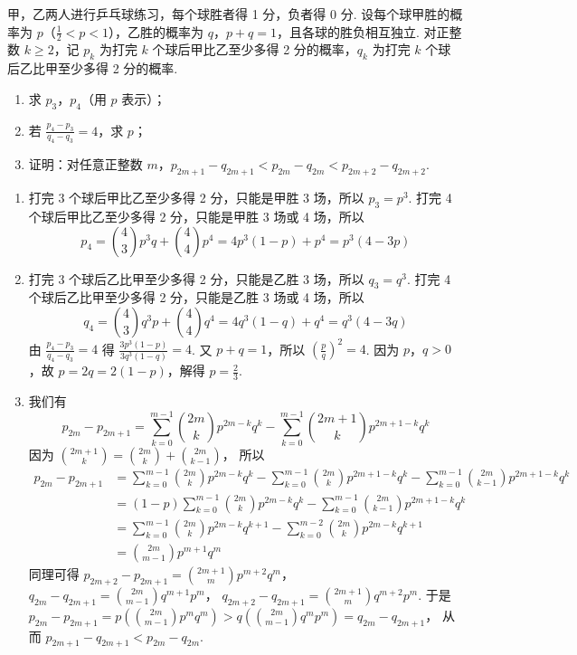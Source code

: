 \documentclass[UTF8,a4paper,oneside,11pt]{ctexbook}
\begin{document}
\begin{problem}
甲，乙两人进行乒乓球练习，每个球胜者得 1 分，负者得 0 分. 设每个球甲胜的概率为 \(p\)（\(\frac12<p<1\)），乙胜的概率为 \(q\)，\(p+q=1\)，且各球的胜负相互独立. 对正整数 \(k\ge 2\)，记 \(p_k\) 为打完 \(k\) 个球后甲比乙至少多得 2 分的概率，\(q_k\) 为打完 \(k\) 个球后乙比甲至少多得 2 分的概率.
\begin{enumerate}
\item 求 \(p_3\)，\(p_4\)（用 \(p\) 表示）；
\item 若 \(\frac{p_4-p_3}{q_4-q_3}=4\)，求 \(p\)；
\item 证明：对任意正整数 \(m\)，\(p_{2m+1}-q_{2m+1}<p_{2m}-q_{2m}<p_{2m+2}-q_{2m+2}\).
\end{enumerate}
\end{problem}

\begin{solution}
\begin{enumerate}
\item 打完 3 个球后甲比乙至少多得 2 分，只能是甲胜 3 场，所以
\(p_3=p^3\).
打完 4 个球后甲比乙至少多得 2 分，只能是甲胜 3 场或 4 场，所以
\[
p_4=\binom43 p^3q+\binom44 p^4
=4p^3(1-p)+p^4
=p^3(4-3p)
\]

\item 打完 3 个球后乙比甲至少多得 2 分，只能是乙胜 3 场，所以
\(q_3=q^3\).
打完 4 个球后乙比甲至少多得 2 分，只能是乙胜 3 场或 4 场，所以
\[
q_4=\binom43 q^3p+\binom44 q^4
=4q^3(1-q)+q^4
=q^3(4-3q)
\]
由
\(\frac{p_4-p_3}{q_4-q_3}=4\)
得
\(\frac{3p^3(1-p)}{3q^3(1-q)}=4\).
又 \(p+q=1\)，所以
\(\left(\frac{p}{q}\right)^2=4\).
因为 \(p\)，\(q>0\)，故 \(p=2q=2(1-p)\)，解得
\(p=\frac23\).

\item 我们有
\[
p_{2m}-p_{2m+1}
=\sum_{k=0}^{m-1}\binom{2m}{k}p^{2m-k}q^k
-\sum_{k=0}^{m-1}\binom{2m+1}{k}p^{2m+1-k}q^k
\]
因为
\(\binom{2m+1}{k}=\binom{2m}{k}+\binom{2m}{k-1}\)，
所以
\begin{align*}
p_{2m}-p_{2m+1}
&=\sum_{k=0}^{m-1}\binom{2m}{k}p^{2m-k}q^k
-\sum_{k=0}^{m-1}\binom{2m}{k}p^{2m+1-k}q^k
-\sum_{k=0}^{m-1}\binom{2m}{k-1}p^{2m+1-k}q^k \\
&=(1-p)\sum_{k=0}^{m-1}\binom{2m}{k}p^{2m-k}q^k
-\sum_{k=0}^{m-1}\binom{2m}{k-1}p^{2m+1-k}q^k \\
&=\sum_{k=0}^{m-1}\binom{2m}{k}p^{2m-k}q^{k+1}
-\sum_{k=0}^{m-2}\binom{2m}{k}p^{2m-k}q^{k+1} \\
&=\binom{2m}{m-1}p^{m+1}q^m
\end{align*}
同理可得
\(p_{2m+2}-p_{2m+1}=\binom{2m+1}{m}p^{m+2}q^m\)，
\(q_{2m}-q_{2m+1}=\binom{2m}{m-1}q^{m+1}p^m\)，
\(q_{2m+2}-q_{2m+1}=\binom{2m+1}{m}q^{m+2}p^m\).
于是
\(
p_{2m}-p_{2m+1}
=p\left(\binom{2m}{m-1}p^mq^m\right)
>q\left(\binom{2m}{m-1}q^mp^m\right)
=q_{2m}-q_{2m+1}
\)，
从而
\(p_{2m+1}-q_{2m+1}<p_{2m}-q_{2m}\).


\end{enumerate}
\end{solution}
\end{document}
